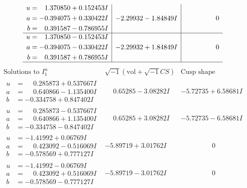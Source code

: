 \documentclass[1p]{elsarticle_modified}
\theoremstyle{definition}
\newcommand{\I}{\sqrt{-1}}
\begin{document}
$$\begin{array}{c|c|c}
\begin{aligned}
u &= \phantom{-}1.370850 + 0.152453 I \\
a &= -0.394075 + 0.330422 I \\
b &= \phantom{-}0.391587 - 0.786955 I\end{aligned}
 & -2.29932 - 1.84849 I & \phantom{-0.000000 } 0 \\ \hline\begin{aligned}
u &= \phantom{-}1.370850 - 0.152453 I \\
a &= -0.394075 - 0.330422 I \\
b &= \phantom{-}0.391587 + 0.786955 I\end{aligned}
 & -2.29932 + 1.84849 I & \phantom{-0.000000 } 0\\
 \hline 
 \end{array}$$\newpage$$\begin{array}{c|c|c}  
\text{Solutions to }I^u_{1}& \I (\text{vol} + \sqrt{-1}CS) & \text{Cusp shape}\\
 \hline 
\begin{aligned}
u &= \phantom{-}0.285873 + 0.537667 I \\
a &= \phantom{-}0.640866 - 1.135400 I \\
b &= -0.334758 + 0.847402 I\end{aligned}
 & \phantom{-}0.65285 - 3.08282 I & -5.72735 + 6.58681 I \\ \hline\begin{aligned}
u &= \phantom{-}0.285873 - 0.537667 I \\
a &= \phantom{-}0.640866 + 1.135400 I \\
b &= -0.334758 - 0.847402 I\end{aligned}
 & \phantom{-}0.65285 + 3.08282 I & -5.72735 - 6.58681 I \\ \hline\begin{aligned}
u &= -1.41992 + 0.06769 I \\
a &= \phantom{-}0.423092 - 0.516069 I \\
b &= -0.578569 + 0.777127 I\end{aligned}
 & -5.89719 + 3.01762 I & \phantom{-0.000000 } 0 \\ \hline\begin{aligned}
u &= -1.41992 - 0.06769 I \\
a &= \phantom{-}0.423092 + 0.516069 I \\
b &= -0.578569 - 0.777127 I\end{aligned}
 & -5.89719 - 3.01762 I & \phantom{-0.000000 } 0 \\ \hline\begin{aligned}

\end{aligned}
\end{array}$$
\end{document}
